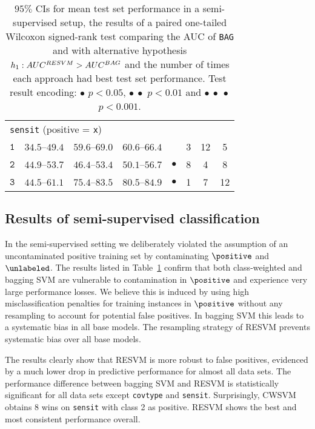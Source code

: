 \begin{table}[!h]
\begin{tabular}{cccccccc}
\multicolumn{3}{l}{\texttt{sensit} (positive = \texttt{x})} \\
$\texttt{1}$ & $34.5$--$49.4$ & $59.6$--$69.0$ & $60.6$--$66.4$ &  & 3 & 12 & 5\\ 
$\texttt{2}$ & $44.9$--$53.7$ & $46.4$--$53.4$ & $50.1$--$56.7$ & $\bullet$ & 8 & 4 & 8\\ 
$\texttt{3}$ & $44.5$--$61.1$ & $75.4$--$83.5$ & $80.5$--$84.9$ & $\bullet$ & 1 & 7 & 12\\ 
\bottomrule
\end{tabular}
\caption{$95\%$ CIs for mean test set performance in a semi-supervised setup, the results of a paired one-tailed Wilcoxon signed-rank test comparing the AUC of \texttt{BAG} and \texttt{\resvm} with alternative hypothesis $h_1: AUC^{RESVM} > AUC^{BAG}$ and the number of times each approach had best test set performance.
Test result encoding: $\bullet$ $p < 0.05$, $\bullet\ \bullet$ $p < 0.01$ and $\bullet\ \bullet\ \bullet$ $p < 0.001$.
}
\label{table:semisupervised}
\end{table}


\subsection{Results of semi-supervised classification}
In the semi-supervised setting we deliberately violated the assumption of an uncontaminated positive training set by contaminating $\positive$ and $\unlabeled$. The results listed in Table~\ref{table:semisupervised} confirm that both class-weighted and bagging SVM are vulnerable to contamination in $\positive$ and experience very large performance losses. We believe this is induced by using high misclassification penalties for training instances in $\positive$ without any resampling to account for potential false positives. In bagging SVM this leads to a systematic bias in all base models. The resampling strategy of RESVM prevents systematic bias over all base models. 

The results clearly show that RESVM is more robust to false positives, evidenced by a much lower drop in predictive performance for almost all data sets. The performance difference between bagging SVM and RESVM is statistically significant for all data sets except \texttt{covtype} and \texttt{sensit}. Surprisingly, CWSVM obtains 8 wins on \texttt{sensit} with class 2 as positive. RESVM shows the best and most consistent performance overall. 

